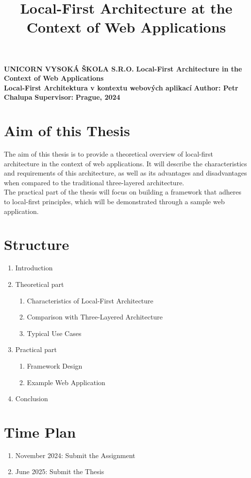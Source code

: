 \documentclass{article}
\title{Local-First Architecture at the Context of Web Applications}
\begin{document}
	\begin{titlepage}
		\begin{center}
			\textbf{UNICORN VYSOKÁ ŠKOLA S.R.O.}
			\vfill
			\textbf{\LARGE Local-First Architecture in the Context of Web Applications\\}
			\vspace{5mm}
			\textbf{Local-First Architektura v kontextu webových aplikací}
			\vfill
			\textbf{Author: Petr Chalupa}
			\vfill
			\textbf{Supervisor: }
			\vfill
			\textbf{Prague, 2024}
			\vfill
		\end{center}
	\end{titlepage}
	\section{Aim of this Thesis}
	The aim of this thesis is to provide a theoretical overview of local-first architecture in the context of web applications. It will describe the characteristics and requirements of this architecture, as well as its advantages and disadvantages when compared to the traditional three-layered architecture.\\
	The practical part of the thesis will focus on building a framework that adheres to local-first principles, which will be demonstrated through a sample web application.
	\section{Structure}
	\begin{enumerate}
		\item Introduction
		\item Theoretical part
		\begin{enumerate}[label=\arabic{enumi}.\arabic*]
			\item Characteristics of Local-First Architecture
			\item Comparison with Three-Layered Architecture
			\item Typical Use Cases
		\end{enumerate}
		\item Practical part
		\begin{enumerate}[label=\arabic{enumi}.\arabic*]
			\item Framework Design
			\item Example Web Application
		\end{enumerate}
		\item Conclusion
	\end{enumerate}
	\nocite{*}
	\printbibliography[title={Literature},heading=bibnumbered]
	\section{Time Plan}
	\begin{enumerate}
		\item November 2024: Submit the Assignment
		\item June 2025: Submit the Thesis
	\end{enumerate}
\end{document}
